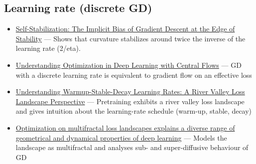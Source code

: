 \documentclass[11pt]{article}
\begin{document}
\subsection*{Learning rate (discrete GD)}
\begin{itemize}
  \item \href{https://arxiv.org/abs/2209.15594}{Self-Stabilization: The Implicit Bias of Gradient Descent at the Edge of Stability} --- Shows that curvature stabilizes around twice the inverse of the learning rate (2/eta).
  \item \href{https://arxiv.org/abs/2410.24206}{Understanding Optimization in Deep Learning with Central Flows} --- GD with a discrete learning rate is equivalent to gradient flow on an effective loss
  \item \href{https://arxiv.org/abs/2410.05192}{Understanding Warmup-Stable-Decay Learning Rates: A River Valley Loss Landscape Perspective} --- Pretraining exhibits a river valley loss landscape and gives intuition about the learning-rate schedule (warm-up, stable, decay)
  \item \href{https://www.nature.com/articles/s41467-025-58532-9}{Optimization on multifractal loss landscapes explains a diverse range of geometrical and dynamical properties of deep learning} --- Models the landscape as multifractal and analyses sub- and super-diffusive behaviour of GD
\end{itemize}
\end{document}

